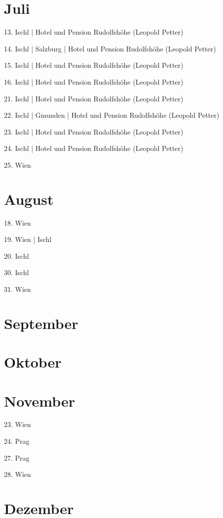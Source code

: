 \documentclass[twoside=false,titlepage=false,open=any, parskip=never, fontsize=10pt, headings=small, chapterprefix=false, appendixprefix=false, DIV=15]{scrbook}
\begin{document}
\begin{multicols}{3}
            \section*{Juli}
            13. Ischl | Hotel und Pension Rudolfshöhe (Leopold Petter)\par
            14. Ischl | Salzburg | Hotel und Pension Rudolfshöhe (Leopold Petter)\par
            15. Ischl | Hotel und Pension Rudolfshöhe (Leopold Petter)\par
            16. Ischl | Hotel und Pension Rudolfshöhe (Leopold Petter)\par
            21. Ischl | Hotel und Pension Rudolfshöhe (Leopold Petter)\par
            22. Ischl | Gmunden | Hotel und Pension Rudolfshöhe (Leopold Petter)\par
            23. Ischl | Hotel und Pension Rudolfshöhe (Leopold Petter)\par
            24. Ischl | Hotel und Pension Rudolfshöhe (Leopold Petter)\par
            25. Wien\par
            \section*{August}
            18. Wien\par
            19. Wien | Ischl\par
            20. Ischl\par
            30. Ischl\par
            31. Wien\par
            \section*{September}
            \section*{Oktober}
            \section*{November}
            23. Wien\par
            24. Prag\par
            27. Prag\par
            28. Wien\par
            \section*{Dezember}

\end{multicols}
\end{document}
